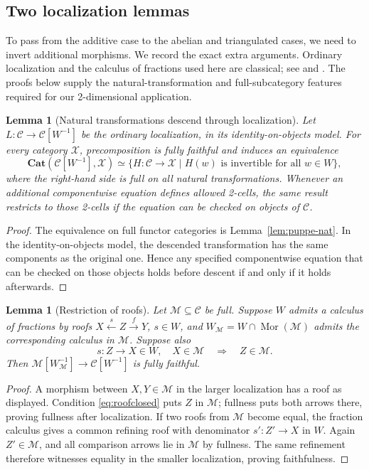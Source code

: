 \documentclass[11pt,reqno,a4paper]{amsart}
\newtheorem{lemma}[theorem]{Lemma}
\theoremstyle{definition}
\theoremstyle{remark}
\newcommand{\C}{\mathcal{C}}
\newcommand{\M}{\mathcal{M}}
\newcommand{\0}{\mathbf{0}}
\renewcommand{\1}{\mathbf{1}}
\newcommand{\Cat}{\mathbf{Cat}}
\newcommand{\X}{\mathcal X}
\DeclareMathOperator{\Mor}{Mor}
\begin{document}
\subsection{Two localization lemmas}\label{subsec:localization}

To pass from the additive case to the abelian and triangulated cases,
we need to invert additional morphisms. We record the exact extra
arguments. Ordinary localization and the calculus of fractions used
here are classical; see \cite[Chapter I]{GZ} and \cite{StacksLoc}.
The proofs below supply the natural-transformation and full-subcategory
features required for our 2-dimensional application.

\begin{lemma}[Natural transformations descend through localization]\label{lem:localizationNat}
Let $L:\C\to\C[W^{-1}]$ be the ordinary localization, in its
identity-on-objects model. For every category $\X$, precomposition
is fully faithful and induces an equivalence
\[
 \Cat(\C[W^{-1}],\X)\simeq
 \{H:\C\to\X\mid H(w)\text{ is invertible for all }w\in W\},
\]
where the right-hand side is full on all natural transformations.
Whenever an additional componentwise equation defines allowed 2-cells,
the same result restricts to those 2-cells if the equation can be checked
on objects of $\C$.
\end{lemma}
\begin{proof}
The equivalence on full functor categories is
Lemma~\ref{lem:puppe-nat}. In the identity-on-objects model,
the descended transformation has the same components as the
original one. Hence any specified componentwise equation
that can be checked on those objects holds before descent
if and only if it holds afterwards.
\end{proof}

\begin{lemma}[Restriction of roofs]\label{lem:roofs}
Let $\M\subseteq\C$ be full. Suppose $W$ admits a calculus of
fractions by roofs $X\xleftarrow{s}Z\xrightarrow{f}Y$, $s\in W$,
and $W_{\M}=W\cap\Mor(\M)$ admits the corresponding calculus in
$\M$. Suppose also
\begin{equation}\label{eq:roofclosed}
 s:Z\to X\in W,\quad X\in\M
 \quad\Longrightarrow\quad Z\in\M.
\end{equation}
Then $\M[W_{\M}^{-1}]\to\C[W^{-1}]$ is fully faithful.
\end{lemma}
\begin{proof}
A morphism between $X,Y\in\M$ in the larger localization has a roof
as displayed. Condition \eqref{eq:roofclosed} puts $Z$ in $\M$;
fullness puts both arrows there, proving fullness after localization.
If two roofs from $\M$ become equal, the fraction calculus gives a
common refining roof with denominator $s':Z'\to X$ in $W$.
Again $Z'\in\M$, and all comparison arrows lie in $\M$ by
fullness. The same refinement therefore witnesses equality in the
smaller localization, proving faithfulness.
\end{proof}
\end{document}
